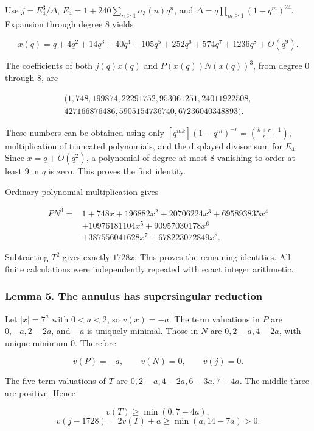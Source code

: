 \documentclass[11pt,a4paper]{article}
\begin{document}
Use \(j=E_4^3/\Delta\), \(E_4=1+240\sum_{n\ge1}\sigma_3(n)q^n\), and \(\Delta=q\prod_{m\ge1}(1-q^m)^{24}\). Expansion through degree 8 yields

\[
x(q)=q+4q^2+14q^3+40q^4+105q^5+252q^6+574q^7+1236q^8+O(q^9).
\]

The coefficients of both \(j(q)x(q)\) and \(P(x(q))N(x(q))^3\), from degree 0 through 8, are

\[
\begin{gathered}(1,748,199874,22291752,953061251,24011922508,\\427166876486,5905154736740,67236040348893).\end{gathered}
\]

These numbers can be obtained using only \([q^{mk}](1-q^m)^{-r}=\binom{k+r-1}{r-1}\), multiplication of truncated polynomials, and the displayed divisor sum for \(E_4\). Since \(x=q+O(q^2)\), a polynomial of degree at most 8 vanishing to order at least 9 in \(q\) is zero. This proves the first identity.

Ordinary polynomial multiplication gives

\[
\begin{aligned}PN^3={}&1+748x+196882x^2+20706224x^3+695893835x^4\\&+10976181104x^5+90957030178x^6\\&+387556041628x^7+678223072849x^8.\end{aligned}
\]

Subtracting \(T^2\) gives exactly \(1728x\). This proves the remaining identities. All finite calculations were independently repeated with exact integer arithmetic.

\hypertarget{lemma-5.-the-annulus-has-supersingular-reduction}{%
\subsubsection{Lemma 5. The annulus has supersingular reduction}\label{lemma-5.-the-annulus-has-supersingular-reduction}}

Let \(|x|=7^a\) with \(0<a<2\), so \(v(x)=-a\). The term valuations in \(P\) are \(0,-a,2-2a\), and \(-a\) is uniquely minimal. Those in \(N\) are \(0,2-a,4-2a\), with unique minimum 0. Therefore

\[
v(P)=-a,\qquad v(N)=0,\qquad v(j)=0.
\tag{R9}
\]

The five term valuations of \(T\) are \(0,2-a,4-2a,6-3a,7-4a\). The middle three are positive. Hence

\[
v(T)\ge\min(0,7-4a),
\] \[
v(j-1728)=2v(T)+a
\ge\min(a,14-7a)>0.
\tag{R10}
\]
\end{document}
